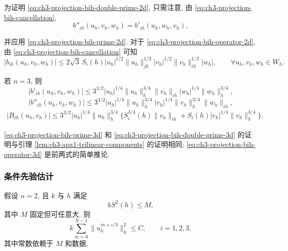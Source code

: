 \begin{Proof}
为证明 \eqref{eq:ch3-projection-bih-double-prime-2d}, 只需注意, 由 \eqref{eq:ch3-projection-bih-cancellation},
\[
b''_{ih}(u_h,v_h,w_h)=b'_{ih}(u_h,w_h,v_h),
\]

\hypertarget{chapter-03-page-299}{}
并应用 \eqref{eq:ch3-projection-bih-prime-2d}. 对于 \eqref{eq:ch3-projection-bih-operator-2d}, 由 \eqref{eq:ch3-projection-bih-cancellation} 可知
\[
|b_{ih}(u_h,v_h,w_h)|
\leq2\sqrt3\,S_i(h)|u_h|^{1/2}\lVert u_h\rVert_{jh}^{1/2}
|v_h|^{1/2}\lVert v_h\rVert_{ih}^{1/2}|w_h|,
\qquad\forall u_h,v_h,w_h\in W_h.
\]
\end{Proof}

\begin{Lemma}
\label{lem:ch3-projection-bih-estimates-three-dimensional}
若 $n=3$, 则
\begin{equation}
|b'_{ih}(u_h,v_h,w_h)|
\leq3^{3/2}|u_h|^{1/4}\lVert u_h\rVert_h^{3/4}
\lVert v_h\rVert_{ih}|w_h|^{1/4}\lVert w_h\rVert_h^{3/4},
\label{eq:ch3-projection-bih-prime-3d}
\end{equation}
\begin{equation}
|b''_{ih}(u_h,v_h,w_h)|
\leq3^{3/2}|u_h|^{1/4}\lVert u_h\rVert_h^{3/4}
|v_h|^{1/4}\lVert v_h\rVert_h^{3/4}\lVert w_h\rVert_{ih},
\label{eq:ch3-projection-bih-double-prime-3d}
\end{equation}
\begin{equation}
\begin{aligned}
|B_{ih}(u_h,v_h)|
\leq3^{3/2}|u_h|^{1/4}\lVert u_h\rVert_h^{3/4}
\bigl\{S_i^{3/4}(h)\lVert v_h\rVert_{ih}
+S_i(h)|v_h|^{1/4}\lVert v_h\rVert_h^{3/4}\bigr\}.
\end{aligned}
\label{eq:ch3-projection-bih-operator-3d}
\end{equation}
\end{Lemma}

\begin{Proof}
\eqref{eq:ch3-projection-bih-prime-3d} 和 \eqref{eq:ch3-projection-bih-double-prime-3d} 的证明与引理 \ref{lem:ch3-apx1-trilinear-components} 的证明相同; \eqref{eq:ch3-projection-bih-operator-3d} 是前两式的简单推论.
\end{Proof}

\subsubsection{条件先验估计}
\label{subsubsec:ch3-projection-conditional-estimates}

\begin{Lemma}
\label{lem:ch3-projection-conditional-estimate-two-dimensional}
假设 $n=2$, 且 $k$ 与 $h$ 满足
\begin{equation}
kS^2(h)\leq M,
\label{eq:ch3-projection-stability-condition-2d}
\end{equation}
其中 $M$ 固定但可任意大. 则
\begin{equation}
k\sum_{m=0}^{N-1}\lVert u_h^{m+i/3}\rVert_h^2
\leq C,\qquad i=1,2,3,
\label{eq:ch3-projection-conditional-bound-2d}
\end{equation}
其中常数依赖于 $M$ 和数据.
\end{Lemma}

